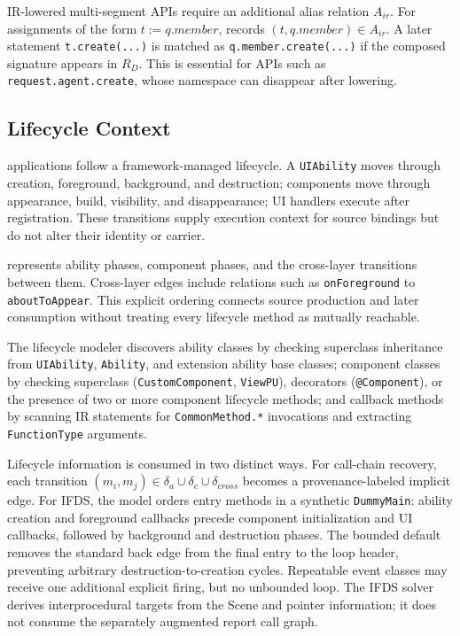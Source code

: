 IR-lowered multi-segment APIs require an additional alias relation $A_{ir}$. For assignments of the form $t := q.member$, \mytool records $(t,q.member)\in A_{ir}$. A later statement \texttt{t.create(...)} is matched as \texttt{q.member.create(...)} if the composed signature appears in $R_D$. This is essential for APIs such as \texttt{request.agent.create}, whose namespace can disappear after lowering.

\subsection{Lifecycle Context}
\label{subsec:lifecycle}

\openharmony applications follow a framework-managed lifecycle. A \texttt{UIAbility} moves through creation, foreground, background, and destruction; components move through appearance, build, visibility, and disappearance; UI handlers execute after registration. These transitions supply execution context for source bindings but do not alter their identity or carrier.

\mytool represents ability phases, component phases, and the cross-layer transitions between them. Cross-layer edges include relations such as \texttt{onForeground} to \texttt{aboutToAppear}. This explicit ordering connects source production and later consumption without treating every lifecycle method as mutually reachable.

The lifecycle modeler discovers ability classes by checking superclass inheritance from \texttt{UIAbility}, \texttt{Ability}, and extension ability base classes; component classes by checking superclass (\texttt{CustomComponent}, \texttt{ViewPU}), decorators (\texttt{@Component}), or the presence of two or more component lifecycle methods; and callback methods by scanning IR statements for \texttt{CommonMethod.*} invocations and extracting \texttt{FunctionType} arguments.

Lifecycle information is consumed in two distinct ways. For call-chain recovery, each transition $(m_i,m_j)\in\delta_a\cup\delta_c\cup\delta_{cross}$ becomes a provenance-labeled implicit edge. For IFDS, the model orders entry methods in a synthetic \texttt{DummyMain}: ability creation and foreground callbacks precede component initialization and UI callbacks, followed by background and destruction phases. The bounded default removes the standard back edge from the final entry to the loop header, preventing arbitrary destruction-to-creation cycles. Repeatable event classes may receive one additional explicit firing, but no unbounded loop. The IFDS solver derives interprocedural targets from the Scene and pointer information; it does not consume the separately augmented report call graph.

